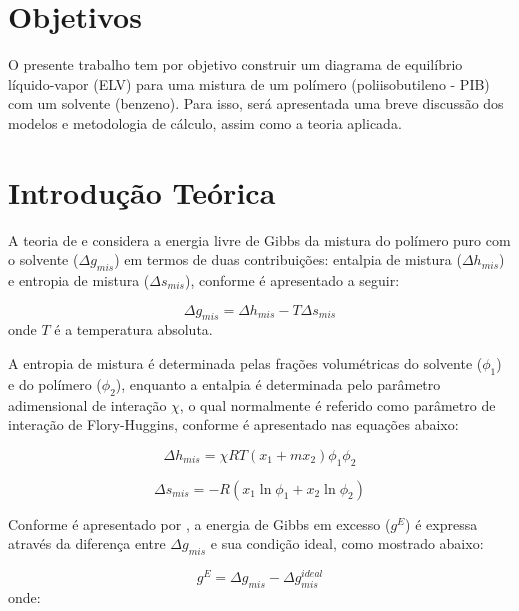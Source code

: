 \section{Objetivos}
O presente trabalho tem por objetivo construir um diagrama de equilíbrio
líquido-vapor (ELV) para uma mistura de um polímero (poliisobutileno - PIB) com
um solvente (benzeno). Para isso, será apresentada uma breve discussão dos
modelos e metodologia de cálculo, assim como a teoria aplicada.

\section{Introdução Teórica}


A teoria de  e  considera a
energia livre de Gibbs da mistura do polímero puro com o solvente
($\Delta g_{mis}$) em termos de duas contribuições: entalpia de mistura 
($\Delta h_{mis}$) e entropia de mistura ($\Delta s_{mis}$), conforme é
apresentado a seguir:

\begin{equation}\label{eq:gemist}
\Delta g_{mis} = \Delta h_{mis} - T\Delta s_{mis}
\end{equation}
onde $T$ é a temperatura absoluta.

A entropia de mistura é determinada pelas frações volumétricas do solvente
($\phi_1$) e do polímero ($\phi_2$), enquanto a entalpia é determinada pelo
parâmetro adimensional de interação $\chi$, o qual normalmente é referido como parâmetro de interação de
Flory-Huggins, conforme é apresentado nas equações abaixo: 

\begin{equation}\label{eq:entalexc}
\Delta h_{mis} = \chi RT\left( x_1 + mx_2 \right)\phi_1\phi_2
\end{equation}

\begin{equation}\label{eq:entroexc}
\Delta s_{mis} = -R\left( x_1\ln\phi_1 + x_2\ln\phi_2 \right)
\end{equation}

Conforme é apresentado por , a energia de Gibbs em
excesso ($g^E$) é expressa através da diferença entre $\Delta g_{mis}$ e sua
condição ideal, como mostrado abaixo:

\begin{equation}\label{eq:geexc1}
g^E = \Delta g_{mis} - \Delta g_{mis}^{ideal}
\end{equation}
onde:


